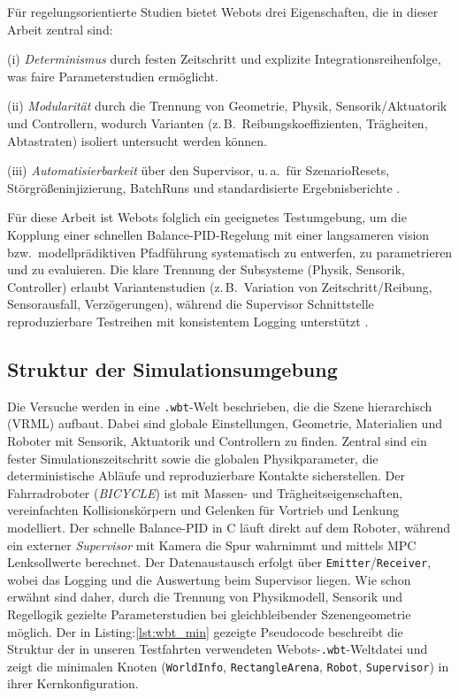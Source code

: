   Für regelungsorientierte Studien bietet Webots drei Eigenschaften, die in dieser Arbeit zentral sind:

  (i) \emph{Determinismus} durch festen 
  Zeitschritt und explizite Integrationsreihenfolge, was faire Parameterstudien ermöglicht.

  (ii) \emph{Modularität} durch die Trennung von 
  Geometrie, Physik, Sensorik/Aktuatorik und Controllern, wodurch Varianten (z.\,B.\ Reibungskoeffizienten, Trägheiten, Abtastraten) isoliert 
  untersucht werden können.

  (iii) \emph{Automatisierbarkeit} über den Supervisor, u.\,a.\ für Szenario\-Resets, Störgrößeninjizierung, Batch\-Runs 
  und standardisierte Ergebnisberichte \citep{cyberbotics2025}.


  Für diese Arbeit ist Webots folglich ein geeignetes Testumgebung, um die Kopplung einer schnellen Balance-PID-Regelung mit einer 
  langsameren vision\- bzw.\ modellprädiktiven Pfadführung systematisch zu entwerfen, zu parametrieren und zu evaluieren. Die klare Trennung 
  der Subsysteme (Physik, Sensorik, Controller) erlaubt Variantenstudien (z.\,B.\ Variation von Zeitschritt/Reibung, Sensorausfall, Verzögerungen), 
  während die Supervisor Schnittstelle reproduzierbare Testreihen mit konsistentem Logging unterstützt \citep{cyberbotics2025}.




  \subsection{Struktur der Simulationsumgebung}
  Die Versuche werden in eine \texttt{.wbt}-Welt beschrieben, die die Szene hierarchisch (VRML) aufbaut. Dabei sind globale 
  Einstellungen, Geometrie, Materialien und Roboter mit Sensorik, Aktuatorik und Controllern zu finden. Zentral sind ein fester 
  Simulationszeitschritt sowie die globalen Physikparameter, die deterministische Abläufe und reproduzierbare Kontakte 
  sicherstellen. Der Fahrradroboter (\emph{BICYCLE}) ist mit Massen- und Trägheitseigenschaften, vereinfachten Kollisionskörpern 
  und Gelenken für Vortrieb und Lenkung modelliert. Der schnelle Balance-PID in C läuft 
  direkt auf dem Roboter, während ein externer \emph{Supervisor} mit Kamera die Spur wahrnimmt und mittels MPC Lenksollwerte 
  berechnet. Der Datenaustausch erfolgt über \texttt{Emitter}/\texttt{Receiver}, wobei das Logging und die Auswertung beim Supervisor liegen. 
  Wie schon erwähnt sind daher, durch die Trennung von Physikmodell, Sensorik und Regellogik gezielte Parameterstudien bei gleichbleibender Szenengeometrie möglich.
  Der in Listing:\ref{lst:wbt_min} gezeigte Pseudocode beschreibt die Struktur der in unseren Testfahrten verwendeten Webots-\texttt{.wbt}-Weltdatei und zeigt die minimalen Knoten 
  (\texttt{WorldInfo}, \texttt{RectangleArena}, \texttt{Robot}, \texttt{Supervisor}) in ihrer Kernkonfiguration.


